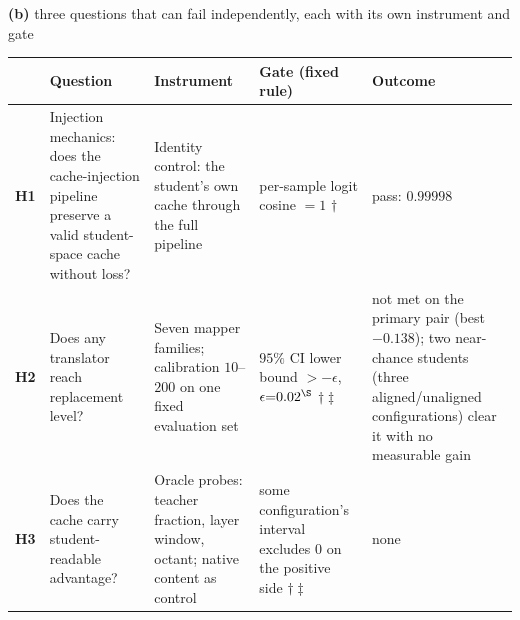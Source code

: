\vspace{1.6mm}
{\footnotesize\textbf{(b)} three questions that can fail independently,
each with its own instrument and gate\par}
\vspace{1.2mm}
{\footnotesize
\setlength{\tabcolsep}{3pt}%
\begin{tabular}{@{}p{0.62cm}p{2.85cm}p{3.55cm}p{3.05cm}p{2.45cm}@{}}
\toprule
 & \textbf{Question} & \textbf{Instrument} & \textbf{Gate (fixed rule)} & \textbf{Outcome} \\
\midrule
\textbf{H1} & Injection mechanics: does the cache-injection pipeline preserve a
valid student-space cache without loss?
 & Identity control: the student's own cache through the full pipeline
 & per-sample logit cosine $=1$ $\dagger$
 & pass: $0.99998$ \\
\addlinespace[1pt]
\textbf{H2} & Does any translator reach replacement level?
 & Seven mapper families; calibration $10$--$200$ on one fixed evaluation set
 & $95\%$ CI lower bound $>-\epsilon$, $\epsilon{=}0.02^{\S}$ $\dagger\ddagger$
 & not met on the primary pair (best $-0.138$); two near-chance students
 (three aligned/unaligned configurations) clear it with no measurable gain \\
\addlinespace[1pt]
\textbf{H3} & Does the cache carry student-readable advantage?
 & Oracle probes: teacher fraction, layer window, octant; native content as control
 & some configuration's interval excludes $0$ on the positive side $\dagger\ddagger$
 & none \\
\bottomrule
\end{tabular}}
